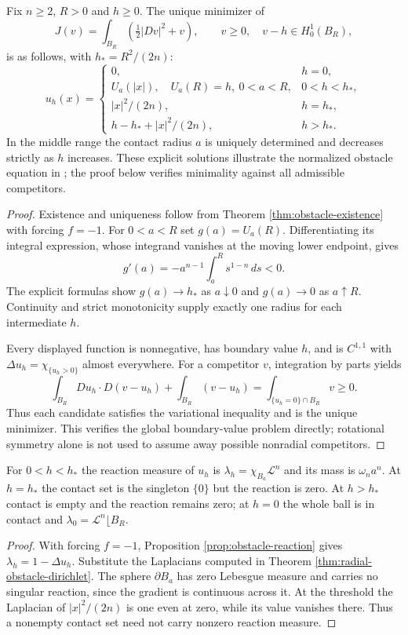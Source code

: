 \begin{theorem}\label{thm:radial-obstacle-dirichlet}
Fix $n\geq2$, $R>0$ and $h\geq0$. The unique minimizer of
\[
 J(v)=\int_{B_R}\left(\tfrac12|Dv|^2+v\right),\qquad
 v\geq0,\quad v-h\in H^1_0(B_R),
\]
is as follows, with $h_*=R^2/(2n)$:
\[
 u_h(x)=\begin{cases}
 0,&h=0,\\
 U_a(|x|),\quad U_a(R)=h,\ 0<a<R,&0<h<h_*,\\
 |x|^2/(2n),&h=h_*,\\
 h-h_*+|x|^2/(2n),&h>h_*.
 \end{cases}
\]
In the middle range the contact radius $a$ is uniquely determined and decreases strictly as $h$ increases.
These explicit solutions illustrate the normalized obstacle equation in \cite{Fig18}; the proof below verifies minimality against all admissible competitors.
\end{theorem}
\begin{proof}
Existence and uniqueness follow from Theorem \ref{thm:obstacle-existence} with forcing $f=-1$. For $0<a<R$ set $g(a)=U_a(R)$. Differentiating its integral expression, whose integrand vanishes at the moving lower endpoint, gives
\[
 g'(a)=-a^{n-1}\int_a^R s^{1-n}\,ds<0.
\]
The explicit formulas show $g(a)\to h_*$ as $a\downarrow0$ and $g(a)\to0$ as $a\uparrow R$. Continuity and strict monotonicity supply exactly one radius for each intermediate $h$.

Every displayed function is nonnegative, has boundary value $h$, and is $C^{1,1}$ with $\Delta u_h=\chi_{\{u_h>0\}}$ almost everywhere. For a competitor $v$, integration by parts yields
\[
 \int_{B_R}Du_h\cdot D(v-u_h)+\int_{B_R}(v-u_h)
 =\int_{\{u_h=0\}\cap B_R}v\geq0.
\]
Thus each candidate satisfies the variational inequality and is the unique minimizer. This verifies the global boundary-value problem directly; rotational symmetry alone is not used to assume away possible nonradial competitors.
\end{proof}

\begin{proposition}\label{prop:radial-obstacle-reaction}
For $0<h<h_*$ the reaction measure of $u_h$ is $\lambda_h=\chi_{B_a}\mathcal L^n$ and its mass is $\omega_n a^n$. At $h=h_*$ the contact set is the singleton $\{0\}$ but the reaction is zero. At $h>h_*$ contact is empty and the reaction remains zero; at $h=0$ the whole ball is in contact and $\lambda_0=\mathcal L^n\lfloor B_R$.
\end{proposition}
\begin{proof}
With forcing $f=-1$, Proposition \ref{prop:obstacle-reaction} gives $\lambda_h=1-\Delta u_h$. Substitute the Laplacians computed in Theorem \ref{thm:radial-obstacle-dirichlet}. The sphere $\partial B_a$ has zero Lebesgue measure and carries no singular reaction, since the gradient is continuous across it. At the threshold the Laplacian of $|x|^2/(2n)$ is one even at zero, while its value vanishes there. Thus a nonempty contact set need not carry nonzero reaction measure.
\end{proof}

